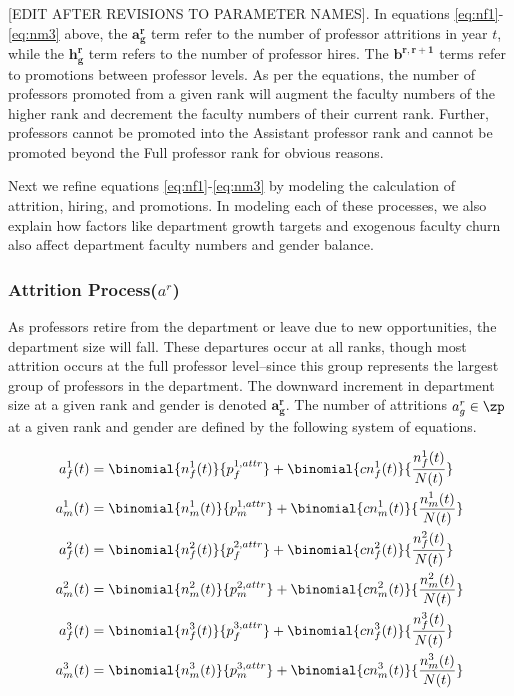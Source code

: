\documentclass[12pt, a4paper, oneside, headinclude, footinclude,english]{article}
\begin{document}
[EDIT AFTER REVISIONS TO PARAMETER NAMES]. In equations \ref{eq:nf1}-\ref{eq:nm3} above, the $\bm{a^r_g}$ term refer to the number of professor
attritions in year $t$, while the $\bm{h^r_g}$ term refers to the number of
professor hires. The $\bm{b^{r, r+1}}$ terms refer to promotions between
professor levels. As per the equations, the number of professors promoted from a
given rank will augment the faculty numbers of the higher rank and decrement the
faculty numbers of their current rank. Further, professors cannot be promoted
into the Assistant professor rank and cannot be promoted beyond the Full
professor rank for obvious reasons. 

Next we refine equations \ref{eq:nf1}-\ref{eq:nm3} by modeling the calculation of
attrition, hiring, and promotions. In modeling each of these processes, we also
explain how factors like department growth targets and exogenous faculty churn
also affect department faculty numbers and gender balance. 

\subsubsection{Attrition Process($a^r$)}
\label{sec:attrition}

As professors retire from the department or leave due to new opportunities, the
department size will fall. These departures occur at all ranks, though most
attrition occurs at the full professor level--since this group represents the
largest group of professors in the department. The downward increment in
department size at a given rank and gender is denoted $\bm{a^r_g}$. The number
of attritions $a^r_g \in \zp$ at a given rank and gender are defined by the
following system of equations.

\begin{align}
  a^1_f(t) &= \binomial{n^1_f(t)}{p^{1, attr}_f} + \binomial{cn^1_f(t)}{\frac{n^1_f(t)}{N(t)}}  \label{eq:attr_f1}\\
  a^1_m(t) &= \binomial{n^1_m(t)}{p^{1, attr}_m} + \binomial{cn^1_m(t)}{\frac{n^1_m(t)}{N(t)}} \label{eq:attr_m1} \\
  a^2_f(t) &= \binomial{n^2_f(t)}{p^{2, attr}_f} + \binomial{cn^2_f(t)}{\frac{n^2_f(t)}{N(t)}} \label{eq:attr_f2} \\
  a^2_m(t) &= \binomial{n^2_m(t)}{p^{2, attr}_m} + \binomial{cn^2_m(t)}{\frac{n^2_m(t)}{N(t)}} \label{eq:attr_m2} \\
  a^3_f(t) &= \binomial{n^3_f(t)}{p^{3, attr}_f} + \binomial{cn^3_f(t)}{\frac{n^3_f(t)}{N(t)}} \label{eq:attr_f3} \\
  a^3_m(t) &= \binomial{n^3_m(t)}{p^{3, attr}_m} + \binomial{cn^3_m(t)}{\frac{n^3_m(t)}{N(t)}} \label{eq:attr_m3} 
\end{align}
\end{document}
